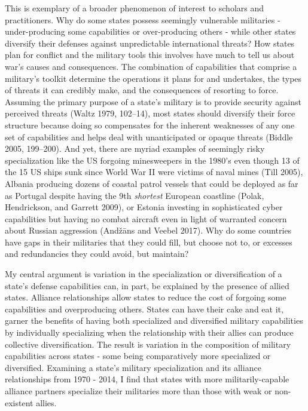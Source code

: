 \documentclass[
  12,
  letterpaper,
  DIV=11,
  numbers=noendperiod]{scrartcl}
\begin{document}
This is exemplary of a broader phenomenon of interest to scholars and
practitioners. Why do some states possess seemingly vulnerable
militaries - under-producing some capabilities or over-producing others
- while other states diversify their defenses against unpredictable
international threats? How states plan for conflict and the military
tools this involves have much to tell us about war's causes and
consequences. The combination of capabilities that comprise a military's
toolkit determine the operations it plans for and undertakes, the types
of threats it can credibly make, and the consequences of resorting to
force. Assuming the primary purpose of a state's military is to provide
security against perceived threats (Waltz 1979, 102--14), most states
should diversify their force structure because doing so compensates for
the inherent weaknesses of any one set of capabilities and helps deal
with unanticipated or opaque threats (Biddle 2005, 199--200). And yet,
there are myriad examples of seemingly risky specialization like the US
forgoing minesweepers in the 1980's even though 13 of the 15 US ships
sunk since World War II were victims of naval mines (Till 2005), Albania
producing dozens of coastal patrol vessels that could be deployed as far
as Portugal despite having the 9th \emph{shortest} European coastline
(Polak, Hendrickson, and Garrett 2009), or Estonia investing in
sophisticated cyber capabilities but having no combat aircraft even in
light of warranted concern about Russian aggression (Andžāns and Veebel
2017). Why do some countries have gaps in their militaries that they
could fill, but choose not to, or excesses and redundancies they could
avoid, but maintain?

My central argument is variation in the specialization or
diversification of a state's defense capabilities can, in part, be
explained by the presence of allied states. Alliance relationships allow
states to reduce the cost of forgoing some capabilities and
overproducing others. States can have their cake and eat it, garner the
benefits of having both specialized and diversified military
capabilities by individually specializing when the relationship with
their allies can produce collective diversification. The result is
variation in the composition of military capabilities across states -
some being comparatively more specialized or diversified. Examining a
state's military specialization and its alliance relationships from 1970
- 2014, I find that states with more militarily-capable alliance
partners specialize their militaries more than those with weak or
non-existent allies.
\end{document}
